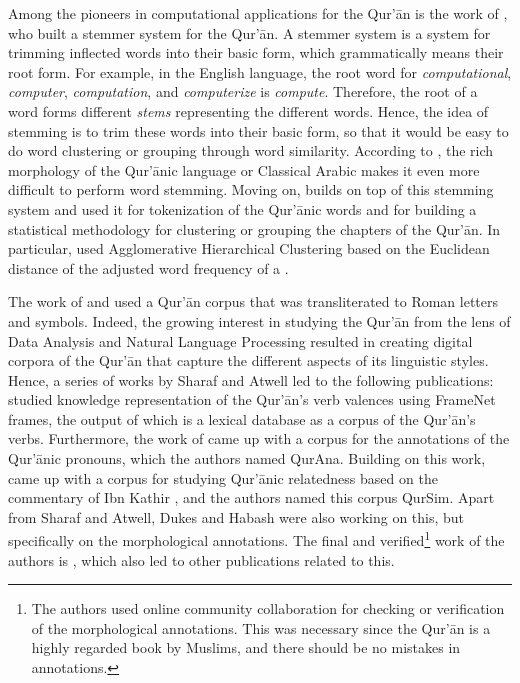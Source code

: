 Among the pioneers in computational applications for the Qur'\=an is the work of , who built a stemmer system for the Qur'\=an. A stemmer system is a system for trimming inflected words into their basic form, which grammatically means their root form. For example, in the English language, the root word for \textit{computational}, \textit{computer}, \textit{computation}, and \textit{computerize} is \textit{compute}. Therefore, the root of a word forms different \textit{stems} representing the different words. Hence, the idea of stemming is to trim these words into their basic form, so that it would be easy to do word clustering or grouping through word similarity. According to , the rich morphology of the Qur'\=anic language or Classical Arabic makes it even more difficult to perform word stemming. Moving on,  builds on top of this stemming system and used it for tokenization of the Qur'\=anic words and for building a statistical methodology for clustering or grouping the chapters of the Qur'\=an. In particular,  used Agglomerative Hierarchical Clustering based on the Euclidean distance of the adjusted word frequency of a  .

The work of  and  used a Qur'\=an corpus that was transliterated to Roman letters and symbols. Indeed, the growing interest in studying the Qur'\=an from the lens of Data Analysis and Natural Language Processing resulted in creating digital corpora of the Qur'\=an that capture the different aspects of its linguistic styles. Hence, a series of works by Sharaf and Atwell led to the following publications:  studied knowledge representation of the Qur'\=an's verb valences using FrameNet frames, the output of which is a lexical database as a corpus of the Qur'\=an's verbs. Furthermore, the work of  came up with a corpus for the annotations of the Qur'\=anic pronouns, which the authors named QurAna. Building on this work,  came up with a corpus for studying Qur'\=anic relatedness based on the commentary of Ibn Kathir , and the authors named this corpus QurSim. Apart from Sharaf and Atwell, Dukes and Habash were also working on this, but specifically on the morphological annotations. The final and verified\footnote{The authors used online community collaboration for checking or verification of the morphological annotations. This was necessary since the Qur'\=an is a highly regarded book by Muslims, and there should be no mistakes in annotations.} work of the authors is , which also led to other publications  related to this.


